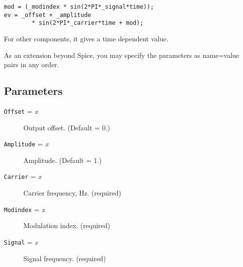 \begin{verbatim}
mod = (_modindex * sin(2*PI*_signal*time));
ev = _offset + _amplitude 
        * sin(2*PI*_carrier*time + mod);
\end{verbatim}

For other components, it gives a time dependent value.

As an extension beyond Spice, you may specify the parameters as
name=value pairs in any order.
\subsection{Parameters}

\begin{description}

\item[{\tt Offset} = {\it x}] Output offset.  (Default = 0.)

\item[{\tt Amplitude} = {\it x}] Amplitude.  (Default = 1.)

\item[{\tt Carrier} = {\it x}] Carrier frequency, Hz.  (required)

\item[{\tt Modindex} = {\it x}] Modulation index.  (required)

\item[{\tt Signal} = {\it x}] Signal frequency.  (required)

\end{description}
